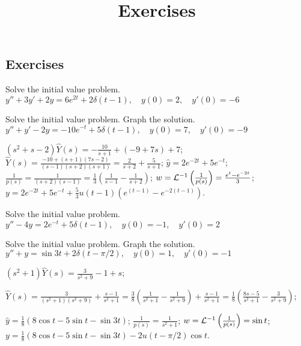 \documentclass{ximera}
\title{Exercises} \license{CC BY-NC-SA 4.0}
\begin{document}
\begin{abstract}
\end{abstract}
\maketitle

\begin{onlineOnly}
\section*{Exercises}
\end{onlineOnly}

\begin{problem}\label{exer:8.7.1}
Solve the initial value
problem.
 $y''+3y'+2y=6e^{2t}+2\delta(t-1), \quad  y(0)=2,\quad y'(0)=-6$
\end{problem}

\begin{problem}\label{exer:8.7.2} 
Solve the initial value
problem.  Graph the solution.
 $y''+y'-2y=-10e^{-t}+5\delta(t-1), \quad  y(0)=7,\quad y'(0)=-9$

\begin{solution}
$(s^2+s-2)\hat Y(s)=-\frac{10}{s+1}+(-9+7s)+7$;
$\hat Y(s)=\frac{-10+(s+1)(7s-2)}{(s-1)(s+2)(s+1)}=\frac{2}{s+2}+\frac{5}{s+1}$;
$\hat y=2e^{-2t}+5e^{-t}$;
$\frac{1}{p(s)}=\frac{1}{(s+2)(s-1)}=\frac{1}{3}\left(\frac{1}{s-1}-\frac{1}{s+2}\right)$;
$w={\cal L}^{-1}\left(\frac{1}{p(s)}\right)=\frac{e^t-e^{-2t}}{3}$;
$y=2e^{-2t}+5e^{-t}+\frac{5}{3}u(t-1)\left(e^{(t-1)}-e^{-2(t-1)}\right)$.
\end{solution}
\end{problem}

\begin{problem}\label{exer:8.7.3}
Solve the initial value
problem.
 $y''-4y=2e^{-t}+5\delta(t-1), \quad  y(0)=-1,\quad y'(0)=2$
\end{problem}

\begin{problem}\label{exer:8.7.4}  Solve the initial value problem.  Graph the solution.
 $y''+y=\sin3t+2\delta(t-\pi/2), \quad  y(0)=1,\quad y'(0)=-1$

\begin{solution}
$(s^2+1)\hat Y(s)=\frac{3}{s^2+9}-1+s$;

$\hat Y(s)=\frac{3}{(s^2+1)(s^2+9)}+\frac{s-1}{s^2+1}=
\frac{3}{8}\left(\frac{1}{s^2+1}-\frac{1}{s^2+9}\right)+\frac{s-1}{s^2+1}
=\frac{1}{8}\left(\frac{8s-5}{s^2+1}-\frac{3}{s^2+9}\right)$;


$\hat y=\frac{1}{8}(8\cos t-5\sin t-\sin3t)$;
$\frac{1}{p(s)}=\frac{1}{s^2+1}$;
$w={\cal L}^{-1}\left(\frac{1}{p(s)}\right)=\sin t$;
$y=\frac{1}{8}(8\cos t-5\sin t-\sin3t)-2u(t-\pi/2)\cos t$.
\end{solution}
\end{problem}
\end{document}
